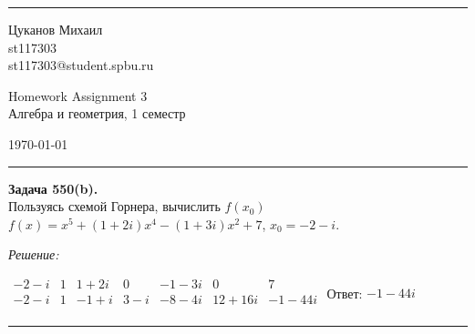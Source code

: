 \documentclass[a4paper, 12pt]{article}
\newenvironment{problem}[2][Задача]
    { \begin{mdframed}[backgroundcolor=gray!10] \textbf{#1 #2.} \\}
    {  \end{mdframed}}
\newenvironment{solution}
    {\textit{Решение: }}
    {\noindent\rule{7in}{1.5pt}}
\begin{document}

\fancyhead[C]{}
\hrule \medskip %
\begin{minipage}{0.295\textwidth}
\raggedright\footnotesize
Цуканов Михаил \hfill\\
st117303 \hfill\\
st117303@student.spbu.ru
\end{minipage}
\begin{minipage}{0.4\textwidth}
\centering\large
Homework Assignment 3\\
\normalsize
Алгебра и геометрия, 1 семестр\\
\end{minipage}
\begin{minipage}{0.295\textwidth}
\raggedleft
\today\hfill\\
\end{minipage}
\medskip\hrule
\bigskip


%
%
%
%


\begin{problem}{550(b)}
Пользуясь схемой Горнера, вычислить $f(x_0)$ $f(x)=x^5+(1+2i)x^4-(1+3i)x^2+7$, $x_0=-2-i$.
\end{problem}
\begin{solution}

$
\begin{array}{c|cccccc}
  -2-i & 1 & 1+2i &   0 & -1-3i & 0 & 7 \\
  -2-i & 1 & -1+i & 3-i & -8-4i & 12+16i & -1-44i \\
\end{array}
$
Ответ: $-1-44i$

\end{solution}
\end{document}
